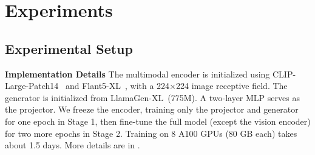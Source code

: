 \section{Experiments}
\label{sec:experiments}

\subsection{Experimental Setup}
\label{sec:details}



\textbf{Implementation Details} 
The multimodal encoder is initialized using CLIP-Large-Patch14~\citep{Radford2021LearningTV} and Flant5-XL~\citep{flant5}, with a 224×224 image receptive field. 
The generator is initialized from LlamaGen-XL~\citep{llamagen}(775M). A two-layer MLP serves as the projector.
We freeze the encoder, training only the projector and generator for one epoch in Stage 1, then fine-tune the full model (except the vision encoder) for two more epochs in Stage 2.
Training on 8 A100 GPUs (80 GB each) takes about 1.5 days. More details are in .




